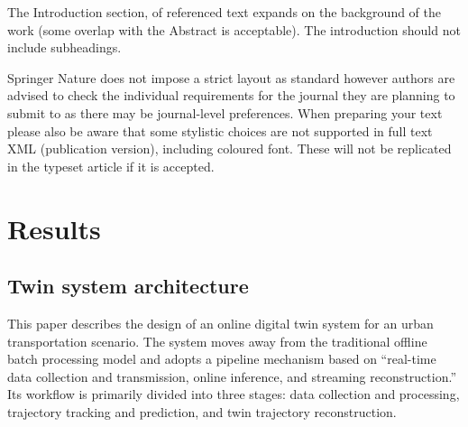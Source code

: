 \documentclass[lineno,pdflatex,sn-basic]{sn-jnl}%
\theoremstyle{thmstyleone}%
\theoremstyle{thmstyletwo}%
\theoremstyle{thmstylethree}%
\begin{document}
The Introduction section, of referenced text \cite{bib1} expands on the background of the work (some overlap with the Abstract is acceptable). The introduction should not include subheadings.

Springer Nature does not impose a strict layout as standard however authors are advised to check the individual requirements for the journal they are planning to submit to as there may be journal-level preferences. When preparing your text please also be aware that some stylistic choices are not supported in full text XML (publication version), including coloured font. These will not be replicated in the typeset article if it is accepted. 

\section{Results}\label{sec2}

\subsection{Twin system architecture}
This paper describes the design of an online digital twin system for an urban transportation scenario.
The system moves away from the traditional offline batch processing model and adopts a pipeline mechanism based on “real-time data collection and transmission, online inference, and streaming reconstruction.” Its workflow is primarily divided into three stages: data collection and processing, trajectory tracking and prediction, and twin trajectory reconstruction.
\end{document}
